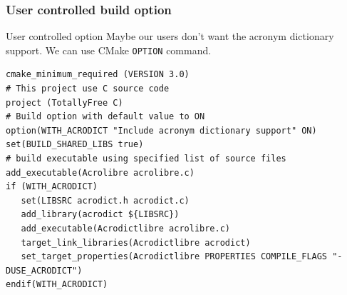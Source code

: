 \documentclass[compress,slidestop,table,usepdftitle=false
              ]
               {beamer}
\begin{document}
\begin{frame}[fragile]
\frametitle{User controlled build option}
\begin{alertblock}{User controlled option}
Maybe our users don't want the acronym dictionary support.
We can use CMake \lstinline!OPTION! command.
\end{alertblock}
\begin{lstlisting}[basicstyle=\tiny,caption=User controlled build option]
cmake_minimum_required (VERSION 3.0)
# This project use C source code
project (TotallyFree C)
# Build option with default value to ON
option(WITH_ACRODICT "Include acronym dictionary support" ON)
set(BUILD_SHARED_LIBS true)
# build executable using specified list of source files
add_executable(Acrolibre acrolibre.c)
if (WITH_ACRODICT)
   set(LIBSRC acrodict.h acrodict.c)
   add_library(acrodict ${LIBSRC})
   add_executable(Acrodictlibre acrolibre.c)
   target_link_libraries(Acrodictlibre acrodict)
   set_target_properties(Acrodictlibre PROPERTIES COMPILE_FLAGS "-DUSE_ACRODICT")
endif(WITH_ACRODICT)
\end{lstlisting}
\end{frame}
\end{document}
